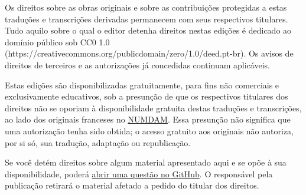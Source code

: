 \documentclass[11pt,twoside,openany]{book}
\newcommand{\FgaUnitKey}{frontmatter}
\begin{document}
Os direitos sobre as obras originais e sobre as contribuições protegidas a estas traduções e transcrições derivadas permanecem com seus respectivos titulares. Tudo aquilo sobre o qual o editor detenha direitos nestas edições é dedicado ao domínio público sob CC0 1.0 (https://creativecommons.org/publicdomain/zero/1.0/deed.pt-br). Os avisos de direitos de terceiros e as autorizações já concedidas continuam aplicáveis.

Estas edições são disponibilizadas gratuitamente, para fins não comerciais e exclusivamente educativos, sob a presunção de que os respectivos titulares dos direitos não se oporiam à disponibilidade gratuita destas traduções e transcrições, ao lado dos originais franceses no \href{https://www.numdam.org/}{NUMDAM}. Essa presunção não significa que uma autorização tenha sido obtida; o acesso gratuito aos originais não autoriza, por si só, sua tradução, adaptação ou republicação.

Se você detém direitos sobre algum material apresentado aqui e se opõe à sua disponibilidade, poderá \href{https://github.com/KokunoYumeto/ega-fga-sga-pt-br/issues}{abrir uma questão no GitHub}. O responsável pela publicação retirará o material afetado a pedido do titular dos direitos.


\tableofcontents
\mainmatter
\def\FgaUnitKey{212}
\def\FgaUnitKey{e212}
\def\FgaUnitKey{221}
\def\FgaUnitKey{e221}
\def\FgaUnitKey{232}
\def\FgaUnitKey{e232}
\def\FgaUnitKey{236}
\def\FgaUnitKey{e236}
\def\FgaUnitKey{com}
\end{document}
